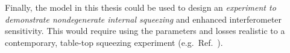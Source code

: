 

Finally, the model in this thesis could be used to design an \emph{experiment to demonstrate nondegenerate internal squeezing} and enhanced interferometer sensitivity. This would require using the parameters and losses realistic to a contemporary, table-top squeezing experiment (e.g.\ Ref.~\cite{sudbeck2020demonstration}). %


